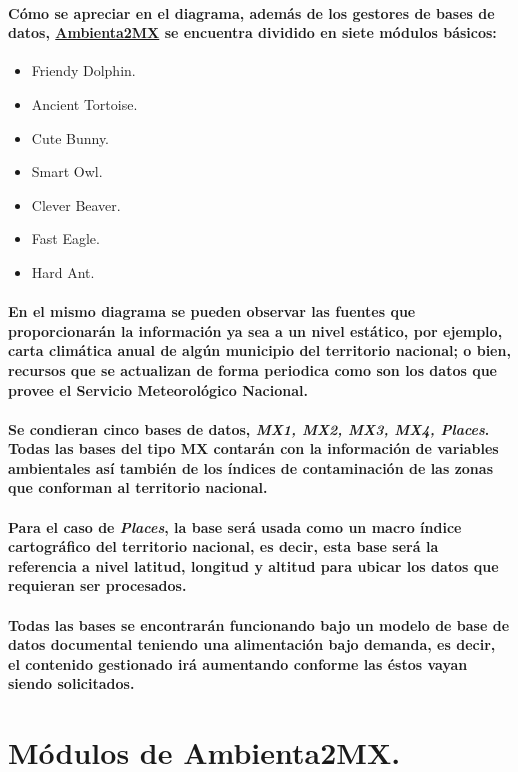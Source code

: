     \paragraph{Cómo se apreciar en el diagrama, además de los gestores de bases de datos, \underline{Ambienta2MX} se encuentra dividido en siete módulos básicos:}
    \begin{itemize}
		\item Friendy Dolphin.
		\item Ancient Tortoise.
		\item Cute Bunny.
		\item Smart Owl.
		\item Clever Beaver.
		\item Fast Eagle.
		\item Hard Ant.
	\end{itemize}
    \paragraph{En el mismo diagrama se pueden observar las fuentes que proporcionarán la información ya sea a un nivel estático, por ejemplo, carta climática anual de algún municipio del territorio nacional; o bien, recursos que se actualizan de forma periodica como son los datos que provee el Servicio Meteorológico Nacional.}
    \paragraph{Se condieran cinco bases de datos, \emph{MX1, MX2, MX3, MX4, Places}. Todas las bases del tipo MX contarán con la información de variables ambientales así también de los índices de contaminación de las zonas que conforman al territorio nacional.}
    \paragraph{Para el caso de \emph{Places}, la base será usada como un macro índice cartográfico del territorio nacional, es decir, esta base será la referencia a nivel latitud, longitud y altitud para ubicar los datos que requieran ser procesados.}
    \paragraph{Todas las bases se encontrarán funcionando bajo un modelo de base de datos documental teniendo una alimentación bajo demanda, es decir, el contenido gestionado irá aumentando conforme las éstos vayan siendo solicitados.}
\section{Módulos de Ambienta2MX.}
